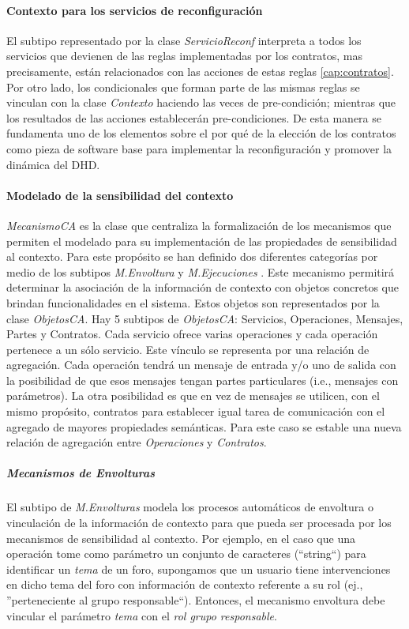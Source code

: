 \paragraph{Contexto para los servicios de reconfiguración}

El subtipo representado por la clase \textit{ServicioReconf} interpreta a todos
los servicios que devienen de las reglas implementadas por los contratos, mas
precisamente, están relacionados con las acciones de estas reglas
\ref{cap:contratos}. Por otro lado, los condicionales que forman parte de las
mismas reglas se vinculan con la clase \textit{Contexto} haciendo las veces de
pre-condición; mientras que los resultados de las acciones
establecerán  pre-condiciones. De esta manera se fundamenta uno de los
elementos sobre el por qué de la elección de los contratos como
pieza de software base para implementar la reconfiguración y promover la
dinámica del DHD.  



\paragraph{Modelado de la sensibilidad del contexto}

\textit{MecanismoCA} es la clase que centraliza la formalización de los
mecanismos que permiten el modelado para su implementación de las propiedades
de sensibilidad al contexto. Para este propósito se han definido dos
diferentes categorías por medio de los subtipos \textit{M.Envoltura} y
\textit{M.Ejecuciones }. Este mecanismo permitirá determinar la asociación de
la información de contexto  con objetos concretos que brindan funcionalidades
en el sistema. Estos objetos son representados por la clase \textit{ObjetosCA}.
Hay 5 subtipos de \textit{ObjetosCA}: Servicios, Operaciones, Mensajes, Partes y
Contratos. Cada servicio ofrece varias operaciones y cada operación pertenece
a un sólo servicio. Este vínculo se representa por una relación de
agregación. Cada operación tendrá un mensaje de entrada y/o uno de salida
con la posibilidad de que esos mensajes tengan partes particulares (i.e.,
mensajes con parámetros). La otra posibilidad es que en vez de mensajes se
utilicen, con el mismo propósito, contratos para establecer igual tarea de
comunicación con el agregado de mayores propiedades semánticas.
Para este caso se estable una nueva relación de agregación entre
\textit{Operaciones} y \textit{Contratos}.



\subparagraph{Mecanismos de Envolturas}
El subtipo de \textit{M.Envolturas} modela los procesos automáticos de envoltura
o vinculación de la información de contexto para que pueda ser procesada por
los mecanismos de sensibilidad al contexto. Por ejemplo, en el caso que una
operación tome como parámetro un conjunto de caracteres (``string``) para
identificar un \textit{tema} de un foro, supongamos que un usuario tiene
intervenciones en dicho tema del foro con información de contexto referente a su
rol (ej., ''perteneciente al grupo responsable``). Entonces, el mecanismo
envoltura debe vincular el parámetro \textit{tema} con el \textit{rol grupo
responsable}.

